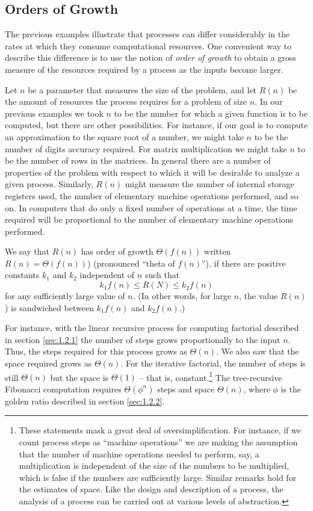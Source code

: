 \subsection{Orders of Growth}
\label{sec:1.2.3}

The previous examples illustrate that processes can differ
considerably in the rates at which they consume computational
resources.  One convenient way to describe this difference is to use
the notion of \textit{order of growth} to obtain a gross measure of the
resources required by a process as the inputs become larger.


Let $n$ be a parameter that measures the size of the problem, and let
$R(n)$ be the amount of resources the process requires for a problem
of size $n$.  In our previous examples we took $n$ to be the number
for which a given function is to be computed, but there are other
possibilities.  For instance, if our goal is to compute an
approximation to the square root of a number, we might take $n$ to be
the number of digits accuracy required.  For matrix multiplication we
might take $n$ to be the number of rows in the matrices.  In general
there are a number of properties of the problem with respect to which
it will be desirable to analyze a given process.  Similarly, $R(n)$
might measure the number of internal storage registers used, the
number of elementary machine operations performed, and so on.  In
computers that do only a fixed number of operations at a time, the
time required will be proportional to the number of elementary machine
operations performed.

We say that $R(n)$ has order of growth $\Theta(f(n))$ written $R(n) = \Theta(f(n))$) (pronounced ``theta of $f(n)$''), if there are
positive constants $k_1$ and $k_2$ independent of $n$ such that
$$k_1 f(n) \le R(N) \le k_2 f(n)$$
for any sufficiently large value of $n$.  (In other
words, for large $n$, the value $R(n)$) is sandwiched between $k_1f(n)$
and $k_2f(n)$.)

For instance, with the linear recursive process for computing
factorial described in section \ref{sec:1.2.1} the
number of steps grows proportionally to the input $n$.  Thus, the
steps required for this process grows as $\Theta(n)$.  We also saw
that the space required grows as $\Theta(n)$.  For the iterative
factorial, the number of steps is still $\Theta(n)$ but the space is
$\Theta(1)$ -- that is, constant.\footnote{These statements mask a
great deal of oversimplification.  For instance, if we count process
steps as ``machine operations'' we are making the assumption that the
number of machine operations needed to perform, say, a multiplication
is independent of the size of the numbers to be multiplied, which is
false if the numbers are sufficiently large.  Similar remarks hold for
the estimates of space.  Like the design and description of a process,
the analysis of a process can be carried out at various levels of
abstraction.} The tree-recursive Fibonacci computation requires
$\Theta(\phi^n)$ steps and space $\Theta(n)$, where $\phi$ is the
golden ratio described in section \ref{sec:1.2.2}.


